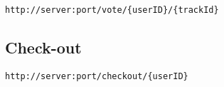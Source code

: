 \begin{lstlisting}[label={lst:endpoint_vote}, caption={Text surrounded by curly brackets are parameters.}]
http://server:port/vote/{userID}/{trackId}
\end{lstlisting}

\subsection{Check-out}

\begin{lstlisting}[label={lst:endpoint_checkout}, caption={Text surrounded by curly brackets are parameters.}]
http://server:port/checkout/{userID}
\end{lstlisting}

